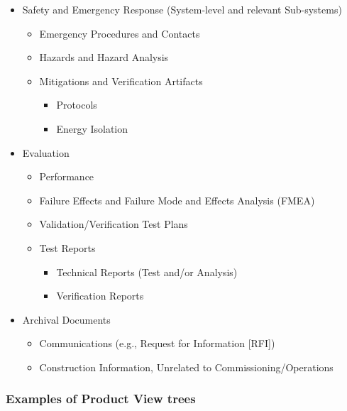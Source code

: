 \begin{small}
\begin{itemize}
  \item Safety and Emergency Response (System-level and relevant Sub-systems)
	\begin{itemize}

	  \item Emergency Procedures and Contacts

	  \item Hazards and Hazard Analysis

	  \item Mitigations and Verification Artifacts
		\begin{itemize}
		  \item Protocols
		  \item Energy Isolation
		\end{itemize}
	\end{itemize}


  \item Evaluation
	\begin{itemize}
	  \item Performance

	  \item Failure Effects and Failure Mode and Effects Analysis (FMEA)

	  \item Validation/Verification Test Plans

	  \item Test Reports
		\begin{itemize}
		  \item Technical Reports (Test and/or Analysis)
		  \item Verification Reports
		\end{itemize}
	\end{itemize}

  \item Archival Documents
	\begin{itemize}
	  \item Communications (e.g., Request for Information [RFI])
	  \item Construction Information, Unrelated to Commissioning/Operations
	\end{itemize}
\end{itemize}

\end{small}

\subsubsection{Examples of Product View trees}

